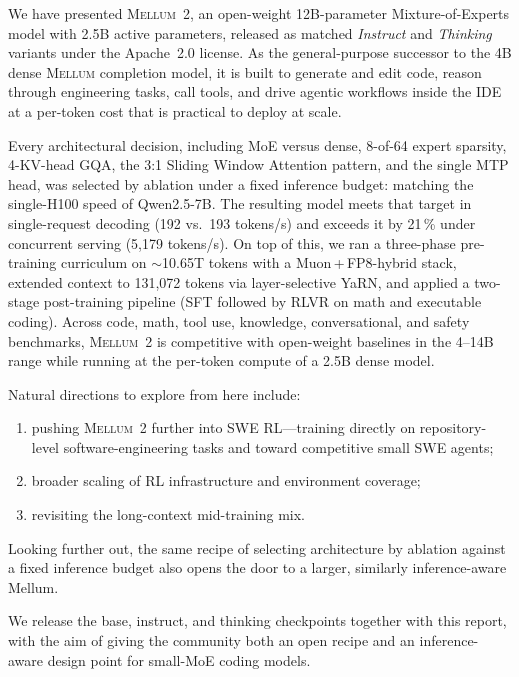 \documentclass{llmxive}
\providecommand{\modelname}{\textsc{Mellum~2}\xspace}
\providecommand{\prevmodelname}{\textsc{Mellum}\xspace}
\begin{document}
We have presented \modelname, an open-weight 12B-parameter Mixture-of-Experts
model with 2.5B active parameters, released as matched \emph{Instruct} and
\emph{Thinking} variants under the Apache~2.0 license. As the general-purpose
successor to the 4B dense \prevmodelname completion model, it is built to
generate and edit code, reason through engineering tasks, call tools, and
drive agentic workflows inside the IDE at a per-token cost that is practical
to deploy at scale.

Every architectural decision, including MoE versus dense, 8-of-64 expert sparsity, 4-KV-head GQA, the 3:1 Sliding Window Attention pattern, and the single MTP head, was selected by ablation under a fixed inference budget: matching the single-H100 speed of Qwen2.5-7B.
The resulting model meets that target in
single-request decoding (192 vs.\ 193 tokens/s) and exceeds it by 21\,\%
under concurrent serving (5{,}179 tokens/s). On top of this, we ran a
three-phase pre-training curriculum on ${\sim}$10.65T tokens with a
Muon\,+\,FP8-hybrid stack, extended context to 131{,}072 tokens via
layer-selective YaRN, and applied a two-stage post-training pipeline (SFT
followed by RLVR on math and executable coding). Across code, math, tool
use, knowledge, conversational, and safety benchmarks, \modelname is
competitive with open-weight baselines in the 4--14B range while running at
the per-token compute of a 2.5B dense model.

Natural directions to explore from here include:
\begin{enumerate}
  \item pushing \modelname further into SWE RL---training directly on
    repository-level software-engineering tasks and toward competitive
    small SWE agents;
  \item broader scaling of RL infrastructure and environment coverage;
  \item revisiting the long-context mid-training mix.
\end{enumerate}
Looking further out, the same recipe of selecting architecture by
ablation against a fixed inference budget also opens the door to a
larger, similarly inference-aware Mellum.

We release the base, instruct, and thinking checkpoints together with
this report,
with the aim of giving the community both an open recipe and an
inference-aware design point for small-MoE coding models.



\printbibliography[title={References}]
\end{document}
